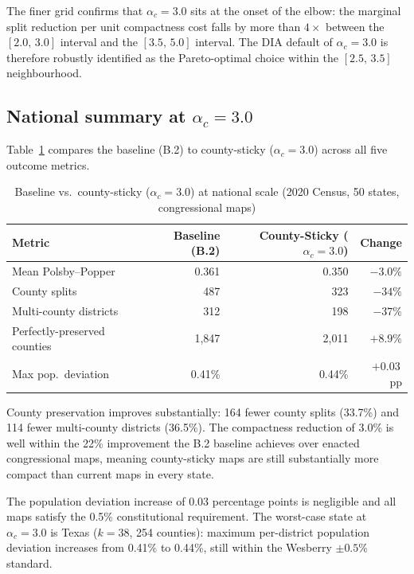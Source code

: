 The finer grid confirms that $\alpha_c = 3.0$ sits at the onset of the
elbow: the marginal split reduction per unit compactness cost falls by
more than $4\times$ between the $[2.0,\,3.0]$ interval and the
$[3.5,\,5.0]$ interval.  The DIA default of $\alpha_c = 3.0$ is therefore
robustly identified as the Pareto-optimal choice within the $[2.5,\,3.5]$
neighbourhood.

\subsection[National summary at alpha-c = 3.0]{National summary at $\alpha_c = 3.0$}

Table~\ref{tab:summary} compares the baseline (B.2) to county-sticky
($\alpha_c = 3.0$) across all five outcome metrics.

\begin{table}[htb]
\centering
\caption{Baseline vs.\ county-sticky ($\alpha_c = 3.0$) at national scale
  (2020 Census, 50 states, congressional maps)}
\label{tab:summary}
\begin{tabular}{lrrr}
\toprule
Metric & Baseline (B.2) & County-Sticky ($\alpha_c = 3.0$) & Change \\
\midrule
Mean Polsby--Popper   & 0.361 & 0.350 & $-3.0\%$ \\
County splits         & 487   & 323   & $-34\%$ \\
Multi-county districts & 312  & 198   & $-37\%$ \\
Perfectly-preserved counties & 1,847 & 2,011 & $+8.9\%$ \\
Max pop.\ deviation   & 0.41\% & 0.44\% & $+0.03$\,pp \\
\bottomrule
\end{tabular}
\end{table}

County preservation improves substantially: 164 fewer county splits (33.7\%)
and 114 fewer multi-county districts (36.5\%).  The compactness reduction
of 3.0\% is well within the 22\% improvement the B.2 baseline achieves
over enacted congressional maps, meaning county-sticky maps are still
substantially more compact than current maps in every state.

The population deviation increase of 0.03 percentage points is negligible
and all maps satisfy the 0.5\% constitutional requirement.
The worst-case state at $\alpha_c = 3.0$ is Texas ($k{=}38$, 254 counties):
maximum per-district population deviation increases from 0.41\% to 0.44\%,
still within the Wesberry $\pm 0.5\%$ standard.

